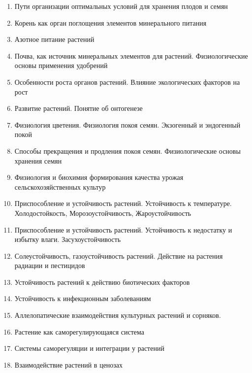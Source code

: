 \begin{enumerate}
	\item Пути организации оптимальных условий для хранения плодов и семян
	\item Корень как орган поглощения элементов минерального питания
	\item Азотное питание растений
	\item Почва, как источник минеральных элементов для растений. Физиологические основы применения удобрений
	\item Особенности роста органов растений. Влияние экологических факторов на рост
	\item Развитие растений. Понятие об онтогенезе
	\item Физиология цветения. Физиология покоя семян. Экзогенный и эндогенный покой
	\item Способы прекращения и продления покоя семян. Физиологические основы хранения семян
	\item Физиология и биохимия формирования качества урожая сельскохозяйственных культур
	\item Приспособление и устойчивость растений. Устойчивость к температуре. Холодостойкость, Морозоустойчивость, Жароустойчивость
	\item Приспособление и устойчивость растений. Устойчивость к недостатку и избытку влаги. Засухоустойчивость
	\item Солеустойчивость, газоустойчивость растений. Действие на растения радиации и пестицидов
	\item Устойчивость растений к действию биотических факторов
	\item Устойчивость к инфекционным заболеваниям
	\item Аллелопатические взаимодействия культурных растений и сорняков.
	\item Растение как саморегулирующаяся система
	\item Системы саморегуляции и интеграции у растений
	\item Взаимодействие растений в ценозах
\end{enumerate}